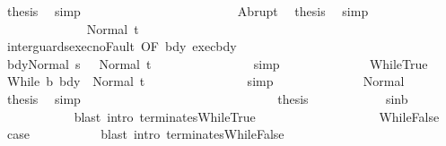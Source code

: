 \begin{isabellebody}
\ {\isacharquery}thesis\ \isamarkupfalse%
\ simp\isanewline
\ \ \ \ \ \ \ \ \ \ \isamarkupfalse%
\isanewline
\ \ \ \ \ \ \ \ \ \ \ \ \isamarkupfalse%
\ Abrupt\ \isamarkupfalse%
\ {\isacharquery}thesis\ \isamarkupfalse%
\ simp\isanewline
\ \ \ \ \ \ \ \ \ \ \isamarkupfalse%
\isanewline
\ \ \ \ \ \ \ \ \ \ \ \ \isamarkupfalse%
\ {\isacharparenleft}Normal\ t{\isacharprime}{\isacharparenright}\isanewline
\ \ \ \ \ \ \ \ \ \ \ \ \isamarkupfalse%
\ inter{\isacharunderscore}guards{\isacharunderscore}exec{\isacharunderscore}noFault\ {\isacharbrackleft}OF\ bdy\ exec{\isacharunderscore}bdy{\isacharbrackright}\isanewline
\ \ \ \ \ \ \ \ \ \ \ \ \isamarkupfalse%
\ {\isachardoublequoteopen}{\isasymGamma}{\isasymturnstile}{\isasymlangle}bdy{}{\isacharcomma}Normal\ s\ {\isasymrangle}\ {\isasymRightarrow}\ Normal\ t{\isacharprime}{\isachardoublequoteclose}\isanewline
\ \ \ \ \ \ \ \ \ \ \ \ \ \ \isamarkupfalse%
\ simp\isanewline
\ \ \ \ \ \ \ \ \ \ \ \ \isamarkupfalse%
\ WhileTrue\ \isamarkupfalse%
\ {\isachardoublequoteopen}{\isasymGamma}{\isasymturnstile}While\ b\ bdy\ {\isasymdown}\ Normal\ t{\isacharprime}{\isachardoublequoteclose}\isanewline
\ \ \ \ \ \ \ \ \ \ \ \ \ \ \isamarkupfalse%
\ simp\isanewline
\ \ \ \ \ \ \ \ \ \ \ \ \isamarkupfalse%
\ Normal\ \isamarkupfalse%
\ {\isacharquery}thesis\ \isamarkupfalse%
\ simp\isanewline
\ \ \ \ \ \ \ \ \ \ \isamarkupfalse%
\isanewline
\ \ \ \ \ \ \ \ \isacommand{{\isacharbraceright}}\isamarkupfalse%
\isanewline
\ \ \ \ \ \ \ \ \isamarkupfalse%
\ \isamarkupfalse%
\ {\isacharquery}thesis\isanewline
\ \ \ \ \ \ \ \ \ \ \isamarkupfalse%
\ s{\isacharunderscore}in{\isacharunderscore}b\ \isanewline
\ \ \ \ \ \ \ \ \ \ \isamarkupfalse%
\ {\isacharparenleft}blast\ intro{\isacharcolon}\ terminates{\isachardot}WhileTrue{\isacharparenright}\isanewline
\ \ \ \ \ \ \isamarkupfalse%
\isanewline
\ \ \ \ \isamarkupfalse%
\isanewline
\ \ \ \ \ \ \isamarkupfalse%
\ WhileFalse\ \isamarkupfalse%
\ {\isacharquery}case\ \isanewline
\ \ \ \ \ \ \ \ \isamarkupfalse%
\ {\isacharparenleft}blast\ intro{\isacharcolon}\ terminates{\isachardot}WhileFalse{\isacharparenright}\isanewline
\ \ \ \ \isamarkupfalse%

\end{isabellebody}
